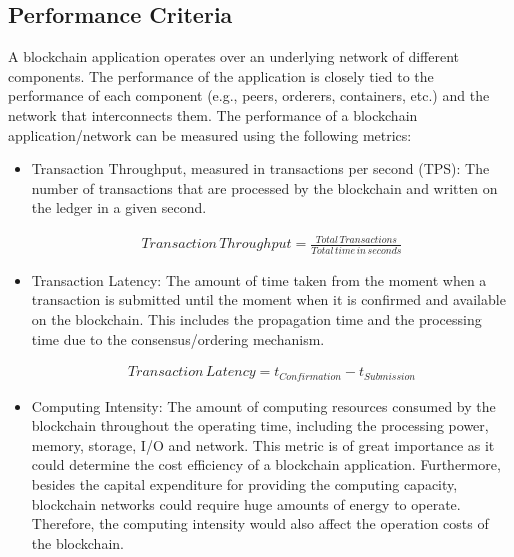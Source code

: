 \documentclass[conference]{IEEEtran}
\begin{document}





\subsection{Performance Criteria}
A blockchain application operates over an underlying network of different components. The performance of the application is closely tied to the performance of each component (e.g., peers, orderers, containers, etc.) and the network that interconnects them. The performance of a blockchain application/network can be measured using the following metrics:

\begin{itemize}
    \item Transaction Throughput, measured in transactions per second (TPS):
    The number of transactions that are processed by the blockchain and written on the ledger in a given second.
    
    \begin{equation} \label{eq1}
    \begin{split}
    Transaction\,Throughput = \frac{Total\,Transactions}{Total\,time\,in\,seconds}
    \end{split}
    \end{equation}

    \item Transaction Latency:
    The amount of time taken from the moment when a transaction is submitted until the moment when it is confirmed and available on the blockchain. This includes the propagation time and the processing time due to the consensus/ordering mechanism.
    
    \begin{equation} \label{eq2}
    \begin{split}
    Transaction\,Latency = t_{Confirmation} - t_{Submission}
    \end{split}
    \end{equation}



    \item Computing Intensity:
    The amount of computing resources consumed by the blockchain throughout the operating time, including the processing power, memory, storage, I/O and network. This metric is of great importance as it could determine the cost efficiency of a blockchain application. Furthermore, besides the capital expenditure for providing the computing capacity, blockchain networks could require huge amounts of energy to operate. Therefore, the computing intensity would also affect the operation costs of the blockchain.
    

\end{itemize}
\end{document}
